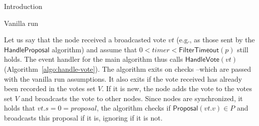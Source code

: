 \documentclass[10pt,a4paper]{article}
\begin{document}
\begin{section}{Introduction}
\begin{subsection}{Vanilla run}

Let us say that the node received a broadcasted vote $vt$ (e.g., as those sent by the $\mathsf{HandleProposal}$ 
algorithm) and assume that $0<timer<\mathsf{FilterTimeout}(p)$ still holds.
The event handler for the main algorithm thus calls $\mathsf{HandleVote}(vt)$ (Algorithm~\ref{algo:handle-vote}).
The algorithm exits on checks --which are passed with the vanilla run assumptions.
It also exits if the vote received has already been recorded in the votes set $V$.
If it is new, the node adds the vote to the votes set $V$ and broadcasts the vote 
to other nodes.
Since nodes are synchronized, it holds that $vt.s=0=proposal$, the algorithm checks if 
$\mathsf{Proposal}(vt.v)\in P$ and broadcasts this proposal if it is, ignoring if it is not.




\end{subsection}
\end{section}
\end{document}
